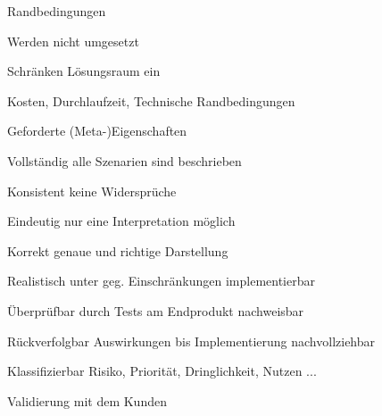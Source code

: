 \documentclass[a4paper]{article}
\begin{document}
\begin{multicols}{3}
  Randbedingungen
  \begin{itemize*}
    \item Werden nicht umgesetzt
    \item Schränken Lösungsraum ein
      \item Kosten, Durchlaufzeit, Technische Randbedingungen
  \end{itemize*}


  Geforderte (Meta-)Eigenschaften
  \begin{description*}
    \item[Vollständig] alle Szenarien sind beschrieben
    \item[Konsistent] keine Widersprüche
    \item[Eindeutig] nur eine Interpretation möglich
    \item[Korrekt] genaue und richtige Darstellung
    \item[Realistisch] unter geg. Einschränkungen implementierbar
    \item[Überprüfbar] durch Tests am Endprodukt nachweisbar
    \item[Rückverfolgbar] Auswirkungen bis Implementierung nachvollziehbar
    \item[Klassifizierbar] Risiko, Priorität, Dringlichkeit, Nutzen ...
    \item[Validierung] mit dem Kunden
  \end{description*}



\end{multicols}
\end{document}
